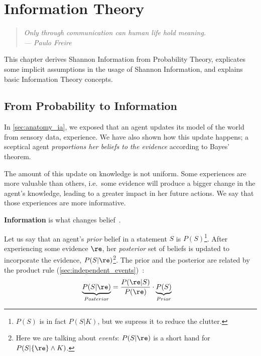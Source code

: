 \chapter{Information Theory}\label{ch:information}

\begin{quotation}
	\small \emph{ \flushright Only through communication can human life hold meaning.\\
	\flushright --- Paulo Freire\\
	\vspace{1cm} }
\end{quotation}
This chapter derives Shannon Information from Probability Theory, explicates some implicit assumptions in the usage of Shannon Information, and explains basic Information Theory concepts.


\section{From Probability to Information}\label{sec:prob2info}
In \cref{sec:anatomy_ia}, we exposed that an agent updates its model of the world from sensory data, experience. We have also shown how this update happens; a sceptical agent \emph{proportions her beliefs to the evidence} according to Bayes' theorem.

The amount of this update on knowledge is not uniform. Some experiences are more valuable than others, i.e.\ some evidence will produce a bigger change in the agent's knowledge, leading to a greater impact in her future actions. We say that those experiences are more informative.
\begin{definition}\label{def:information}
	\textbf{Information} is what changes belief~\cite{sowinski:2016,caticha:2008}.
\end{definition}

Let us say that an agent's \emph{prior} belief in a statement \(S\) is \(P(S) \)\footnote{\(P(S) \) is in fact \(P(S|K) \), but we supress it to reduce the clutter.}. After experiencing some evidence \(\re\), her \emph{posterior} set of beliefs is updated to incorporate the evidence, \(P(S|\re )\)\footnote{Here we are talking about \emph{events}: \(P(S|\re )\) is a short hand for \(P(S|\{\re\} \land K )\).}. The prior and the posterior are related by the product rule (\cref{sec:independent_events})~\cite{sowinski:2016}:
\begin{align}
	\underbrace{P(S|\re)}_{Posterior}&= \frac{P(\re | S )}{P(\re)}\cdot \underbrace{P(S)}_{Prior}
\end{align}

